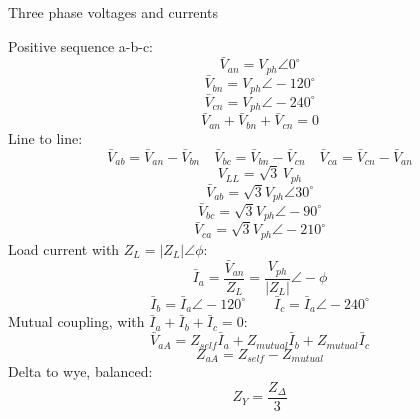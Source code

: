 Three phase voltages and currents

Positive sequence a-b-c:
$$\bar V_{an}=V_{ph}\angle0^{\circ}$$
$$\bar V_{bn}=V_{ph}\angle-120^{\circ}$$
$$\bar V_{cn}=V_{ph}\angle-240^{\circ}$$
$$\bar V_{an}+\bar V_{bn}+\bar V_{cn}=0$$
Line to line:
$$\bar V_{ab}=\bar V_{an}-\bar V_{bn}\quad \bar V_{bc}=\bar V_{bn}-\bar V_{cn}\quad \bar V_{ca}=\bar V_{cn}-\bar V_{an}$$
$$V_{LL}=\sqrt{3}\,V_{ph}$$
$$\bar V_{ab}=\sqrt{3}V_{ph}\angle30^{\circ}$$
$$\bar V_{bc}=\sqrt{3}V_{ph}\angle-90^{\circ}$$
$$\bar V_{ca}=\sqrt{3}V_{ph}\angle-210^{\circ}$$
Load current with $Z_L=\left|Z_L\right|\angle\phi$:
$$\bar I_a=\frac{\bar V_{an}}{Z_L}=\frac{V_{ph}}{\left|Z_L\right|}\angle-\phi$$
$$\bar I_b=\bar I_a\angle-120^{\circ}\qquad \bar I_c=\bar I_a\angle-240^{\circ}$$
Mutual coupling, with $\bar I_a+\bar I_b+\bar I_c=0$:
$$\bar V_{aA}=Z_{self}\bar I_a+Z_{mutual}\bar I_b+Z_{mutual}\bar I_c$$
$$Z_{aA}=Z_{self}-Z_{mutual}$$
Delta to wye, balanced:
$$Z_Y=\frac{Z_\Delta}{3}$$
